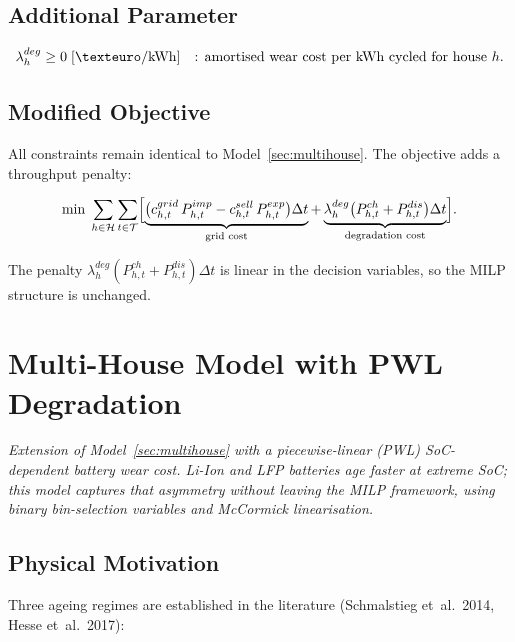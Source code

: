 \documentclass{article}
\begin{document}
\subsection{Additional Parameter}
\[
  \lambda^{deg}_h \ge 0
  \;[\texteuro/\mathrm{kWh}] \quad \text{: amortised wear cost per kWh cycled for house } h.
\]

\subsection{Modified Objective}

All constraints remain identical to Model~\ref{sec:multihouse}.
The objective adds a throughput penalty:

\begin{equation}
  \min \;\sum_{h \in \mathcal{H}}\sum_{t \in \mathcal{T}}
  \Bigl[
    \underbrace{\bigl(c^{grid}_{h,t}\,P^{imp}_{h,t}
                     - c^{sell}_{h,t}\,P^{exp}_{h,t}\bigr)\Delta t}_{\text{grid cost}}
    +
    \underbrace{\lambda^{deg}_h
                \bigl(P^{ch}_{h,t} + P^{dis}_{h,t}\bigr)\Delta t}_{\text{degradation cost}}
  \Bigr].
  \label{eq:OBJ_deg}
\end{equation}

The penalty $\lambda^{deg}_h (P^{ch}_{h,t}+P^{dis}_{h,t})\Delta t$ is linear
in the decision variables, so the MILP structure is unchanged.

\newpage
\section{Multi-House Model with PWL Degradation}
\label{sec:deg_pwl}

\textit{Extension of Model~\ref{sec:multihouse} with a piecewise-linear (PWL)
SoC-dependent battery wear cost. Li-Ion and LFP batteries age faster at
extreme SoC; this model captures that asymmetry without leaving the MILP
framework, using binary bin-selection variables and McCormick linearisation.}

\subsection{Physical Motivation}

Three ageing regimes are established in the literature
(Schmalstieg et~al.\ 2014, Hesse et~al.\ 2017):
\end{document}
